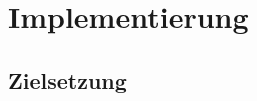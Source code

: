%
\chapter{Implementierung}
\label{sec:implementierung}

\section{Zielsetzung}
\label{sec:system:sec1}